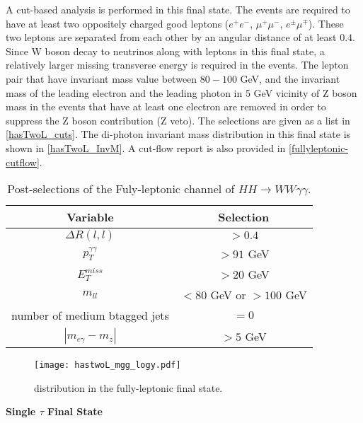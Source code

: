 {A cut-based analysis is performed in this final state. The events are required to have at least two oppositely charged good leptons ($e^+e^-$, $\mu^+\mu^-$, $e^\pm\mu^\mp$). These two leptons are separated from each other by an angular distance of at least $0.4$. Since W boson decay to neutrinos along with leptons in this final state, a relatively larger missing transverse energy is required in the events. The lepton pair that have invariant mass value between $80-100$ GeV, and the invariant mass of the leading electron and the leading photon in 5 GeV vicinity of Z boson mass in the events that have at least one electron are removed in order to suppress the Z boson contribution (Z veto). The selections are given as a list in \autoref{hasTwoL_cuts}. The di-photon invariant mass distribution in this final state is shown in \autoref{hasTwoL_InvM}. A cut-flow report is also provided in \autoref{fullyleptonic-cutflow}.

\begin{table}[h]
    \centering
        \caption{Post-selections of the Fuly-leptonic channel of $HH\rightarrow{WW\gamma\gamma}$.}
        \begin{tabular}{c|c}
            Variable & Selection \\ \hline
            $\Delta R(l,l)$ & $> 0.4$ \\
            $p_T^{\gamma\gamma} $ & $> 91 $ GeV \\
            $E_T^{miss}$ & $> 20 $ GeV \\
            $m_{ll}$ & $<80$ GeV or $>100 $ GeV \\
            number of medium btagged jets & $ = 0 $ \\
            $|m_{e\gamma} - m_{z}|$ & $ > 5 $ GeV \\
        \end{tabular}
    \label{hasTwoL_cuts}
\end{table}

\begin{figure}[h!]
    \centering
	\texttt{[image: hastwoL\_mgg\_logy.pdf]}
	\vspace{2mm}
	\caption{\mgg distribution in the fully-leptonic final state.}
	\label{hasTwoL_InvM}
\end{figure}

\textbf{Single $\tau$ Final State}

}
